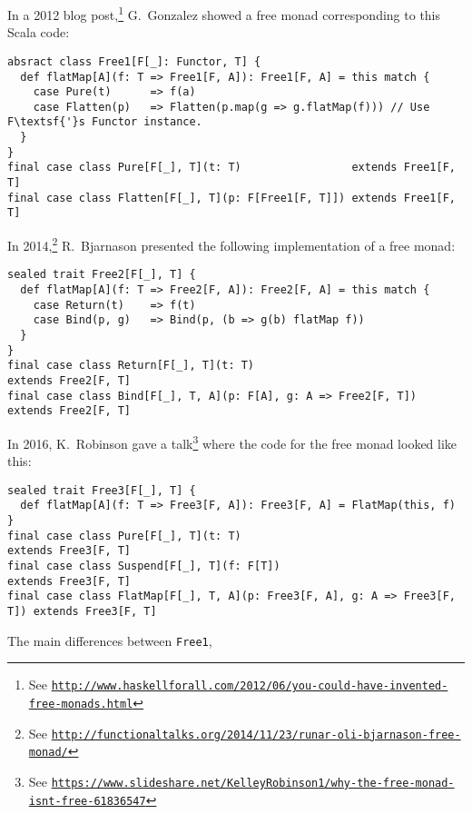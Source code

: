 In a 2012 blog post,\footnote{See \texttt{\href{http://www.haskellforall.com/2012/06/you-could-have-invented-free-monads.html}{http://www.haskellforall.com/2012/06/you-could-have-invented-free-monads.html}}}
G.~Gonzalez
showed a free monad corresponding to this Scala code:
\begin{lstlisting}
absract class Free1[F[_]: Functor, T] {
  def flatMap[A](f: T => Free1[F, A]): Free1[F, A] = this match {
    case Pure(t)      => f(a)
    case Flatten(p)   => Flatten(p.map(g => g.flatMap(f))) // Use F\textsf{'}s Functor instance.
  }
}
final case class Pure[F[_], T](t: T)                 extends Free1[F, T]
final case class Flatten[F[_], T](p: F[Free1[F, T]]) extends Free1[F, T] 
\end{lstlisting}
In 2014,\footnote{See \texttt{\href{http://functionaltalks.org/2014/11/23/runar-oli-bjarnason-free-monad/}{http://functionaltalks.org/2014/11/23/runar-oli-bjarnason-free-monad/}}}
R.~Bjarnason presented the following
implementation of a free monad:
\begin{lstlisting}
sealed trait Free2[F[_], T] {
  def flatMap[A](f: T => Free2[F, A]): Free2[F, A] = this match {
    case Return(t)    => f(t)
    case Bind(p, g)   => Bind(p, (b => g(b) flatMap f))
  }
}
final case class Return[F[_], T](t: T)                          extends Free2[F, T]
final case class Bind[F[_], T, A](p: F[A], g: A => Free2[F, T]) extends Free2[F, T]
\end{lstlisting}
In 2016, K.~Robinson gave a talk\footnote{See \texttt{\href{https://www.slideshare.net/KelleyRobinson1/why-the-free-monad-isnt-free-61836547}{https://www.slideshare.net/KelleyRobinson1/why-the-free-monad-isnt-free-61836547}}}
where the code for the free monad looked like this:
\begin{lstlisting}
sealed trait Free3[F[_], T] {
  def flatMap[A](f: T => Free3[F, A]): Free3[F, A] = FlatMap(this, f) 
}
final case class Pure[F[_], T](t: T)                                      extends Free3[F, T]
final case class Suspend[F[_], T](f: F[T])                                extends Free3[F, T]
final case class FlatMap[F[_], T, A](p: Free3[F, A], g: A => Free3[F, T]) extends Free3[F, T]
\end{lstlisting}
The main differences between \lstinline!Free1!,
